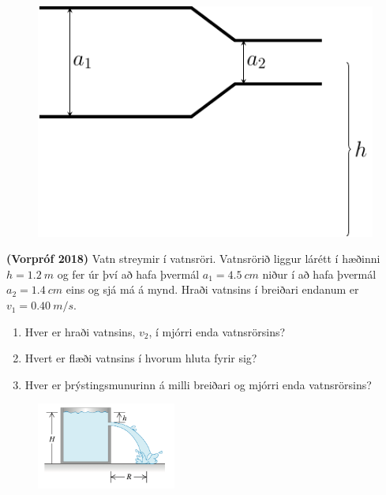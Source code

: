 \begin{enumerate}[label = \textbf{Dæmi \thechapter.\arabic*.}]
\begin{minipage}{\linewidth}
\begin{figure}
\vspace{-0.5cm}
\includegraphics[scale=0.6]{images/pipe_test.pdf}
\end{figure}

\item \textbf{(Vorpróf 2018)} Vatn streymir í vatnsröri. Vatnsrörið liggur lárétt í hæðinni $h = \SI{1.2}{m}$ og fer úr því að hafa þvermál $a_1 = \SI{4.5}{cm}$ niður í að hafa þvermál $a_2=\SI{1.4}{cm}$ eins og sjá má á mynd. Hraði vatnsins í breiðari endanum er $v_1 = \SI{0.40}{m/s}$.
\begin{enumerate}[label = \textbf{(\alph*)}]
    \item Hver er hraði vatnsins, $v_2$, í mjórri enda vatnsrörsins?
    \item Hvert er flæði vatnsins í hvorum hluta fyrir sig?
    \item Hver er þrýstingsmunurinn á milli breiðari og mjórri enda vatnsrörsins?
\end{enumerate}
\end{minipage}


\begin{minipage}{\linewidth}
\begin{figure}
\vspace{-0.5cm}
\includegraphics[width = 1.8in]{images/vatnstankur.png}
\end{figure}


\end{minipage}
\end{enumerate}
